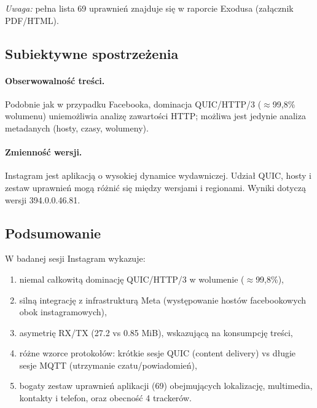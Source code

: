 \emph{Uwaga:} pełna lista 69 uprawnień znajduje się w raporcie Exodusa (załącznik PDF/HTML).

\subsection{Subiektywne spostrzeżenia}
\paragraph{Obserwowalność treści.}
Podobnie jak w przypadku Facebooka, dominacja QUIC/HTTP/3 ($\approx$99,8\% wolumenu) uniemożliwia analizę zawartości HTTP; możliwa jest jedynie analiza metadanych (hosty, czasy, wolumeny).

\paragraph{Zmienność wersji.}
Instagram jest aplikacją o wysokiej dynamice wydawniczej. Udział QUIC, hosty i zestaw uprawnień mogą różnić się między wersjami i regionami. Wyniki dotyczą wersji 394.0.0.46.81.

\subsection{Podsumowanie}
W badanej sesji Instagram wykazuje:
\begin{enumerate}
\item niemal całkowitą dominację QUIC/HTTP/3 w wolumenie ($\approx$99,8\%),
\item silną integrację z infrastrukturą Meta (występowanie hostów facebookowych obok instagramowych),
\item asymetrię RX/TX (27.2 vs 0.85 MiB), wskazującą na konsumpcję treści,
\item różne wzorce protokołów: krótkie sesje QUIC (content delivery) vs długie sesje MQTT (utrzymanie czatu/powiadomień),
\item bogaty zestaw uprawnień aplikacji (69) obejmujących lokalizację, multimedia, kontakty i telefon, oraz obecność 4 trackerów.
\end{enumerate}
